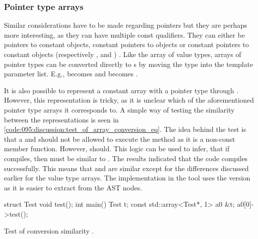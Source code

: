 \subsubsection*{Pointer type arrays}
Similar considerations have to be made regarding pointers but they are perhaps more interesting, as they can have multiple const qualifiers.
They can either be pointers to constant objects, constant pointers to objects or constant pointers to constant objects (respectively ,  and ) \cite{cppreferencePointerDeclarationCppreference}.
Like the array of value types, arrays of pointer types can be converted directly to s by moving the type into the template parameter list.
E.g.,  becomes  and  becomes .

It is also possible to represent a constant array with a pointer type through .
However, this representation is tricky, as it is unclear which of the aforementioned pointer type arrays it corresponds to.
A simple way of testing the similarity between the representations is seen in \cref{code:095:discussion:test_of_array_conversion_eq}.
The idea behind the test is that a  and  should not be allowed to execute the  method as it is a non-const member function. However,  should.
This logic can be used to infer, that if  compiles, then  must be similar to .
The results indicated that the code compiles successfully.
This means that  and  are similar except for the differences discussed earlier for the value type arrays. The implementation in the tool uses the  version as it is easier to extract from the AST nodes.


\begin{listing}[H]
    \begin{cppcode}
struct Test {void test(){}};
int main() {
    Test t;
    const std::array<Test*, 1> a0 {&t};
    a0[0]->test();
}
    \end{cppcode}
    \caption{Test of conversion similarity
    .}
    \label{code:095:discussion:test_of_array_conversion_eq}
\end{listing}


